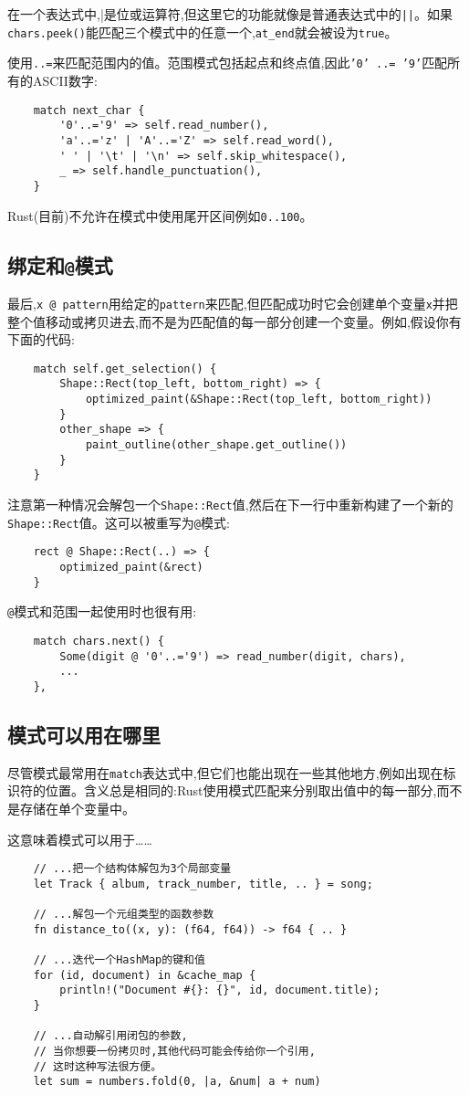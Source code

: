在一个表达式中,|是位或运算符,但这里它的功能就像是普通表达式中的\texttt{||}。如果\texttt{chars.peek()}能匹配三个模式中的任意一个,\texttt{at\_end}就会被设为\texttt{true}。

使用\texttt{..=}来匹配范围内的值。范围模式包括起点和终点值,因此\texttt{'0' ..= '9'}匹配所有的ASCII数字:
\begin{verbatim}
    match next_char {
        '0'..='9' => self.read_number(),
        'a'..='z' | 'A'..='Z' => self.read_word(),
        ' ' | '\t' | '\n' => self.skip_whitespace(),
        _ => self.handle_punctuation(),
    }
\end{verbatim}

Rust(目前)不允许在模式中使用尾开区间例如\texttt{0..100}。

\subsection{绑定和\texttt{@}模式}
最后,\texttt{x @ pattern}用给定的\texttt{pattern}来匹配,但匹配成功时它会创建单个变量\texttt{x}并把整个值移动或拷贝进去,而不是为匹配值的每一部分创建一个变量。例如,假设你有下面的代码:
\begin{verbatim}
    match self.get_selection() {
        Shape::Rect(top_left, bottom_right) => {
            optimized_paint(&Shape::Rect(top_left, bottom_right))
        }
        other_shape => {
            paint_outline(other_shape.get_outline())
        }
    }    
\end{verbatim}
注意第一种情况会解包一个\texttt{Shape::Rect}值,然后在下一行中重新构建了一个新的\texttt{Shape::Rect}值。这可以被重写为\texttt{@}模式:
\begin{verbatim}
    rect @ Shape::Rect(..) => {
        optimized_paint(&rect)
    }
\end{verbatim}

\texttt{@}模式和范围一起使用时也很有用:
\begin{verbatim}
    match chars.next() {
        Some(digit @ '0'..='9') => read_number(digit, chars),
        ...
    },
\end{verbatim}

\subsection{模式可以用在哪里}
尽管模式最常用在\texttt{match}表达式中,但它们也能出现在一些其他地方,例如出现在标识符的位置。含义总是相同的:Rust使用模式匹配来分别取出值中的每一部分,而不是存储在单个变量中。

这意味着模式可以用于……
\begin{verbatim}
    // ...把一个结构体解包为3个局部变量
    let Track { album, track_number, title, .. } = song;

    // ...解包一个元组类型的函数参数
    fn distance_to((x, y): (f64, f64)) -> f64 { .. }

    // ...迭代一个HashMap的键和值
    for (id, document) in &cache_map {
        println!("Document #{}: {}", id, document.title);
    }

    // ...自动解引用闭包的参数,
    // 当你想要一份拷贝时,其他代码可能会传给你一个引用,
    // 这时这种写法很方便。
    let sum = numbers.fold(0, |a, &num| a + num)
\end{verbatim}

